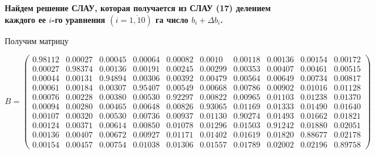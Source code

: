 \documentclass[a4paper, 12pt]{extarticle}
\begin{document}
\textbf{Найдем решение СЛАУ, которая получается из СЛАУ (17) делением каждого ее $i$-го уравнения $(i = \overline{1, 10})$ га число $b_i + \Delta b_i$.}

Получим матрицу

\begin{equation}
    B = \begin{pmatrix}
        0.98112 & 0.00027 & 0.00045 & 0.00064 & 0.00082 & 0.0010 & 0.00118 & 0.00136 & 0.00154 & 0.00172 \\ 
        0.00027 & 0.98374 & 0.00136 & 0.00191 & 0.00245 & 0.00299 & 0.00353 & 0.00407 & 0.00461 & 0.00515 \\ 
        0.00044 & 0.00131 & 0.94894 & 0.00306 & 0.00392 & 0.00479 & 0.00564 & 0.00649 & 0.00734 & 0.00817 \\ 
        0.00061 & 0.00184 & 0.00307 & 0.95407 & 0.00549 & 0.00668 & 0.00786 & 0.00902 & 0.01016 & 0.01128 \\ 
        0.00076 & 0.00228 & 0.00380 & 0.00530 & 0.92297 & 0.00822 & 0.00965 & 0.01103 & 0.01238 & 0.01370 \\ 
        0.00094 & 0.00280 & 0.00465 & 0.00648 & 0.00826 & 0.93065 & 0.01169 & 0.01333 & 0.01490 & 0.01640 \\ 
        0.00107 & 0.00320 & 0.00530 & 0.00736 & 0.00937 & 0.01130 & 0.90274 & 0.01493 & 0.01662 & 0.01821 \\ 
        0.00124 & 0.00371 & 0.00614 & 0.00850 & 0.01078 & 0.01296 & 0.01503 & 0.91242 & 0.01880 & 0.02051 \\ 
        0.00136 & 0.00407 & 0.00672 & 0.00927 & 0.01171 & 0.01402 & 0.01619 & 0.01820 & 0.88677 & 0.02178 \\ 
        0.00154 & 0.00457 & 0.00754 & 0.01038 & 0.01306 & 0.01557 & 0.01789 & 0.02002 & 0.02196 & 0.89758
   \end{pmatrix}
\end{equation}
\end{document}
